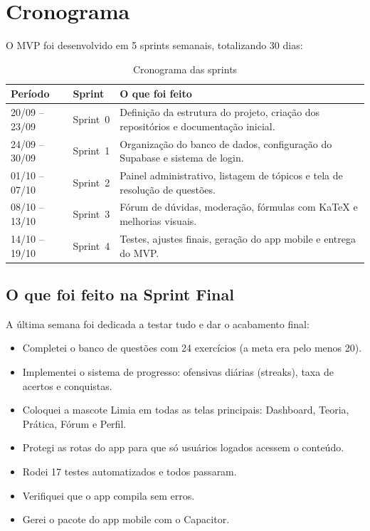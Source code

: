 \documentclass[12pt, a4paper]{article}
\begin{document}
\section{Cronograma}

O MVP foi desenvolvido em 5 sprints semanais, totalizando 30 dias:

\begin{table}[H]
\centering
\caption{Cronograma das sprints}
\begin{tabularx}{\textwidth}{l l X}
\toprule
\textbf{Per\'{i}odo} & \textbf{Sprint} & \textbf{O que foi feito} \\
\midrule
20/09 -- 23/09 & Sprint~0 & Defini\c{c}\~{a}o da estrutura do projeto, cria\c{c}\~{a}o dos reposit\'{o}rios e documenta\c{c}\~{a}o inicial. \\
24/09 -- 30/09 & Sprint~1 & Organiza\c{c}\~{a}o do banco de dados, configura\c{c}\~{a}o do Supabase e sistema de login. \\
01/10 -- 07/10 & Sprint~2 & Painel administrativo, listagem de t\'{o}picos e tela de resolu\c{c}\~{a}o de quest\~{o}es. \\
08/10 -- 13/10 & Sprint~3 & F\'{o}rum de d\'{u}vidas, modera\c{c}\~{a}o, f\'{o}rmulas com KaTeX e melhorias visuais. \\
14/10 -- 19/10 & Sprint~4 & Testes, ajustes finais, gera\c{c}\~{a}o do app mobile e entrega do MVP. \\
\bottomrule
\end{tabularx}
\end{table}

\subsection{O que foi feito na Sprint Final}

A \'{u}ltima semana foi dedicada a testar tudo e dar o acabamento final:

\begin{itemize}[leftmargin=2cm]
  \item Completei o banco de quest\~{o}es com 24 exerc\'{i}cios (a meta era pelo menos 20).
  \item Implementei o sistema de progresso: ofensivas di\'{a}rias (streaks), taxa de acertos e conquistas.
  \item Coloquei a mascote Limia em todas as telas principais: Dashboard, Teoria, Pr\'{a}tica, F\'{o}rum e Perfil.
  \item Protegi as rotas do app para que s\'{o} usu\'{a}rios logados acessem o conte\'{u}do.
  \item Rodei 17 testes automatizados e todos passaram.
  \item Verifiquei que o app compila sem erros.
  \item Gerei o pacote do app mobile com o Capacitor.
\end{itemize}
\end{document}
